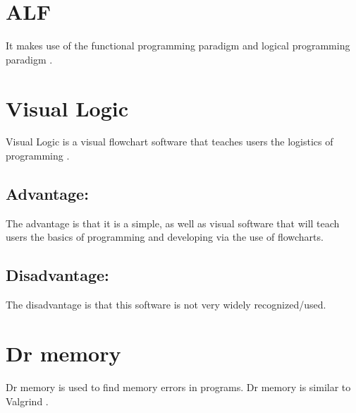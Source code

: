 \documentclass{article}
\begin{document}
\section{ALF}
\label{sec:ALF}

It makes use of the functional programming paradigm and logical programming paradigm \cite{geeksforgeeks-paradigms}.

\section{Visual Logic}
\label{sec:Visual Logic}

Visual Logic is a visual flowchart software that teaches users the logistics of programming \cite{visual-logic}.

\subsection*{Advantage:}
The advantage is that it is a simple, as well as visual software that will teach users the basics of programming and developing via the use of flowcharts.

\subsection*{Disadvantage:}
The disadvantage is that this software is not very widely recognized/used.


\section{Dr memory}
\label{sec:dr mem}

Dr memory is used to find memory errors in programs. Dr memory is similar to Valgrind \cite{dr-memory}.







\end{document}
